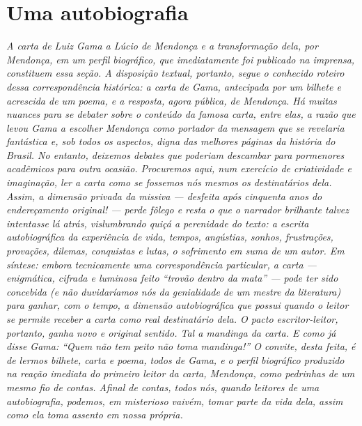 
\part{Uma autobiografia}

\begin{didas}
\emph{A carta de Luiz Gama a Lúcio de Mendonça e a transformação dela,
por Mendonça, em um perfil biográfico, que imediatamente foi publicado
na imprensa, constituem essa seção. A disposição textual, portanto,
segue o conhecido roteiro dessa correspondência histórica: a carta de
Gama, antecipada por um bilhete e acrescida de um poema, e a resposta,
agora pública, de Mendonça. Há muitas nuances para se debater sobre o
conteúdo da famosa carta, entre elas, a razão que levou Gama a escolher
Mendonça como portador da mensagem que se revelaria fantástica e, sob
todos os aspectos, digna das melhores páginas da história do Brasil. No
entanto, deixemos debates que poderiam descambar para pormenores
acadêmicos para outra ocasião. Procuremos aqui, num exercício de
criatividade e imaginação, ler a carta como se fossemos nós mesmos os
destinatários dela. Assim, a dimensão privada da missiva --- desfeita
após cinquenta anos do endereçamento original! --- perde fôlego e resta o
que o narrador brilhante talvez intentasse lá atrás, vislumbrando quiçá
a perenidade do texto: a escrita autobiográfica da experiência de vida,
tempos, angústias, sonhos, frustrações, provações, dilemas, conquistas e
lutas, o sofrimento em suma de um autor. Em síntese: embora tecnicamente
uma correspondência particular, a carta --- enigmática, cifrada e
luminosa feito ``trovão dentro da mata'' --- pode ter sido concebida (e não
duvidaríamos nós da genialidade de um mestre da literatura) para ganhar,
com o tempo, a dimensão autobiográfica que possui quando o leitor se
permite receber a carta como real destinatário dela. O pacto
escritor-leitor, portanto, ganha novo e original sentido. Tal a mandinga
da carta. E como já disse Gama: ``Quem não tem peito não toma mandinga!''
O convite, desta feita, é de lermos bilhete, carta e poema, todos de
Gama, e o perfil biográfico produzido na reação imediata do primeiro
leitor da carta, Mendonça, como pedrinhas de um mesmo fio de contas.
Afinal de contas, todos nós, quando leitores de uma autobiografia,
podemos, em misterioso vaivém, tomar parte da vida dela, assim como ela
toma assento em nossa própria.}
\end{didas}

